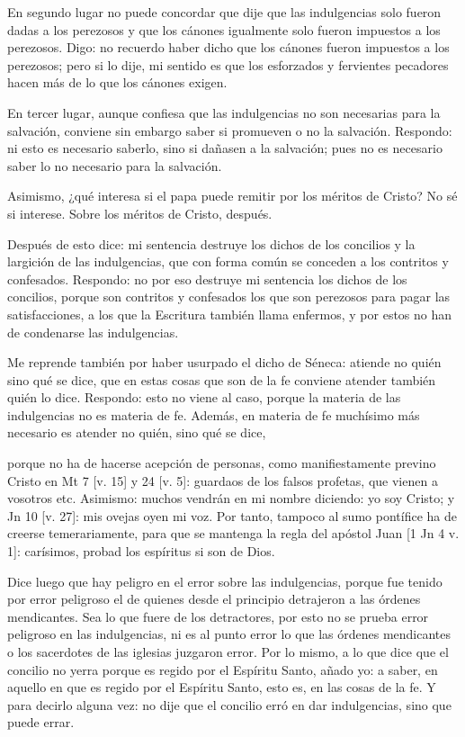 En segundo lugar no puede concordar que dije que las indulgencias solo fueron dadas a los perezosos y que los cánones igualmente solo fueron impuestos a los perezosos. Digo: no recuerdo haber dicho que los cánones fueron impuestos a los perezosos; pero si lo dije, mi sentido es que los esforzados y fervientes pecadores hacen más de lo que los cánones exigen.

En tercer lugar, aunque confiesa que las indulgencias no son necesarias para la salvación, conviene sin embargo saber si promueven o no la salvación. Respondo: ni esto es necesario saberlo, sino si dañasen a la salvación; pues no es necesario saber lo no necesario para la salvación.

Asimismo, ¿qué interesa si el papa puede remitir por los méritos de Cristo? No sé si interese. Sobre los méritos de Cristo, después.

Después de esto dice: mi sentencia destruye los dichos de los concilios y la largición de las indulgencias, que con forma común se conceden a los contritos y confesados. Respondo: no por eso destruye mi sentencia los dichos de los concilios, porque son contritos y confesados los que son perezosos para pagar las satisfacciones, a los que la Escritura también llama enfermos, y por estos no han de condenarse las indulgencias.

Me reprende también por haber usurpado el dicho de Séneca: atiende no quién sino qué se dice, que en estas cosas que son de la fe conviene atender también quién lo dice. Respondo: esto no viene al caso, porque la materia de las indulgencias no es materia de fe. Además, en materia de fe muchísimo más necesario es atender no quién, sino qué se dice,

porque no ha de hacerse acepción de personas, como manifiestamente previno Cristo en Mt 7 [v. 15] y 24 [v. 5]: guardaos de los falsos profetas, que vienen a vosotros etc. Asimismo: muchos vendrán en mi nombre diciendo: yo soy \marginpar{\small[355]} Cristo; y Jn 10 [v. 27]: mis ovejas oyen mi voz. Por tanto, tampoco al sumo pontífice ha de creerse temerariamente, para que se mantenga la regla del apóstol Juan [1 Jn 4 v. 1]: carísimos, probad los espíritus si son de Dios.

Dice luego que hay peligro en el error sobre las indulgencias, porque fue tenido por error peligroso el de quienes desde el principio detrajeron a las órdenes mendicantes. Sea lo que fuere de los detractores, por esto no se prueba error peligroso en las indulgencias, ni es al punto error lo que las órdenes mendicantes o los sacerdotes de las iglesias juzgaron error. Por lo mismo, a lo que dice que el concilio no yerra porque es regido por el Espíritu Santo, añado yo: a saber, en aquello en que es regido por el Espíritu Santo, esto es, en las cosas de la fe. Y para decirlo alguna vez: no dije que el concilio erró en dar indulgencias, sino que puede errar.

